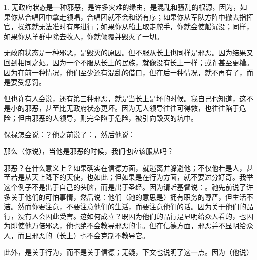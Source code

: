 \par

1. 无政府状态是一种邪恶，是许多灾难的缘由，是混乱和骚乱的根源。因为，如果你从合唱团中拿走领唱，合唱团就不会和谐有序；如果你从军队方阵中撤去指挥官，操练就无法准时有序进行；如果你从船上取走舵手，你就会使船沉没；同样，如果你从羊群中除去牧人，你就倾覆并毁灭了一切。\par

无政府状态是一种邪恶，是毁灭的原因。但不服从长上也同样是邪恶。因为结果又回到相同之处。因为一个不服从长上的民族，就像没有长上一样；或许甚至更糟。因为在前一种情况，他们至少还有混乱的借口，但在后一种情况，就不再有了，而是要受惩罚。\par

但也许有人会说，还有第三种邪恶，就是当长上是坏的时候。我自己也知道，这不是小的邪恶，甚至比无政府状态更坏。因为无人领导往往可得救，也往往陷于危险；但由邪恶的人领导，则完全陷于危险，被引向毁灭的坑中。\par

保禄怎会说：？他之前说了：，然后他说：\par

那么（你说），当他是邪恶的时候，我们也应该服从吗？\par

邪恶？在什么意义上？如果确实在信德方面，就逃离并躲避他；不仅他若是人，甚至若是从天上降下的天使，也如此；但如果是在行为方面，就不要过分好奇。我举这个例子不是出于自己的头脑，而是出于圣经。因为请听基督说：。祂先前说了许多关于他们的可怕事情，然后说：他们（祂的意思是）拥有职务的尊严，但生活不洁。然而你要注意，不要注意他们的生活，而要注意他们的话。因为关于他们的品行，没有人会因此受害。这如何成立？既因为他们的品行是显明给众人看的，也因为即使他万倍邪恶，他也绝不会教导邪恶的事。但在信德方面，邪恶并不显明给众人，而且邪恶的（长上）也不会克制不教导它。\par

此外，是关于行为，而不是关于信德；无疑，下文也说明了这一点。因为（他说）\par

